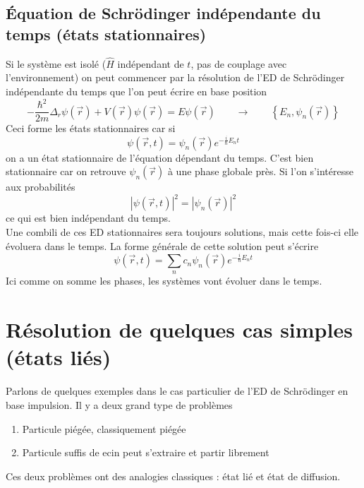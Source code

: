 	\subsection{Équation de Schrödinger indépendante du temps (états stationnaires)}
	Si le système est isolé ($\hat H$ indépendant de $t$, pas de couplage avec l'environnement) on peut commencer 
	par la résolution de l'ED de Schrödinger indépendante du temps que l'on peut écrire en base position
	\begin{equation}
	-\frac{\hbar^2}{2m}\Delta_r\psi(\vec{r}) + V(\vec{r})\psi(\vec{r}) = E\psi(\vec{r})\qquad\longrightarrow
	\qquad \left\{E_n,\psi_n(\vec{r})\right\}
	\end{equation}
	Ceci forme les états stationnaires car si
	\begin{equation}
	\psi(\vec{r},t) = \psi_n(\vec{r})e^{-\frac{i}{\hbar}E_nt}
	\end{equation}
	on a un état stationnaire de l'équation dépendant du temps. C'est bien stationnaire car on retrouve 
	$\psi_n(\vec{r})$ à une phase globale près. Si l'on s'intéresse aux probabilités
	\begin{equation}
	|\psi(\vec{r},t)|^2 = |\psi_n(\vec{r})|^2
	\end{equation}
	ce qui est bien indépendant du temps. \\
	
	Une combili de ces ED stationnaires sera toujours solutions, mais cette fois-ci elle évoluera dans le 
	temps. La forme générale de cette solution peut s'écrire
	\begin{equation}
	\psi(\vec{r},t) = \sum_n c_n\psi_n(\vec{r})e^{-\frac{i}{\hbar}E_nt}
	\end{equation}
	Ici comme on somme les phases, les systèmes vont évoluer dans le temps.
	
\section{Résolution de quelques cas simples (états liés)}
Parlons de quelques exemples dans le cas particulier de l'ED de Schrödinger en base impulsion. Il y a 
deux grand type de problèmes
\begin{enumerate}
\item Particule piégée, classiquement piégée
\item Particule suffis de ecin peut s'extraire et partir librement
\end{enumerate}
Ces deux problèmes ont des analogies classiques : état lié et état de diffusion.\\

